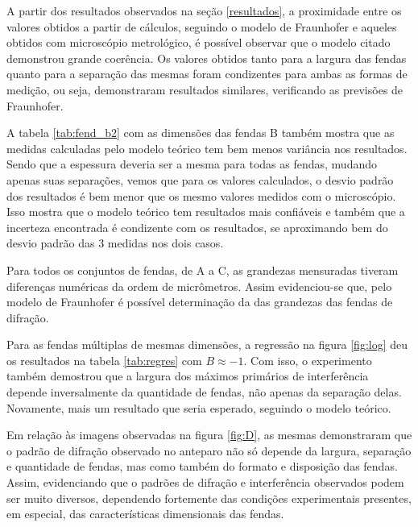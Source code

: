 A partir dos resultados observados na seção \ref{resultados}, a proximidade entre os valores obtidos a partir de cálculos, seguindo o modelo de Fraunhofer e aqueles obtidos com microscópio metrológico, é possível observar que o modelo citado demonstrou grande coerência. Os valores obtidos tanto para a largura das fendas quanto para a separação das mesmas foram condizentes para ambas as formas de medição, ou seja, demonstraram resultados similares, verificando as previsões de Fraunhofer.

A tabela \ref{tab:fend_b2} com as dimensões das fendas B também mostra que as medidas calculadas pelo modelo teórico tem bem menos variância nos resultados. Sendo que a espessura deveria ser a mesma para todas as fendas, mudando apenas suas separações, vemos que para os valores calculados, o desvio padrão dos resultados é bem menor que os mesmo valores medidos com o microscópio. Isso mostra que o modelo teórico tem resultados mais confiáveis e também que a incerteza encontrada é condizente com os resultados, se aproximando bem do desvio padrão das 3 medidas nos dois casos.

Para todos os conjuntos de fendas, de A a C, as grandezas mensuradas tiveram diferenças numéricas da ordem de micrômetros. Assim evidenciou-se que, pelo modelo de Fraunhofer é possível determinação da das grandezas das fendas de difração.

Para as fendas múltiplas de mesmas dimensões, a regressão na figura \ref{fig:log} deu os resultados na tabela \ref{tab:regres} com $B \approx -1$. Com isso, o experimento também demostrou que a largura dos máximos primários de interferência depende inversalmente da quantidade de fendas, não apenas da separação delas. Novamente, mais um resultado que seria esperado, seguindo o modelo teórico.

Em relação às imagens observadas na figura \ref{fig:D}, as mesmas demonstraram que o padrão de difração observado no anteparo não só depende da largura, separação e quantidade de fendas, mas como também do formato e disposição das fendas. Assim, evidenciando que o padrões de difração e interferência observados podem ser muito diversos, dependendo fortemente das condições experimentais presentes, em especial, das características dimensionais das fendas.

